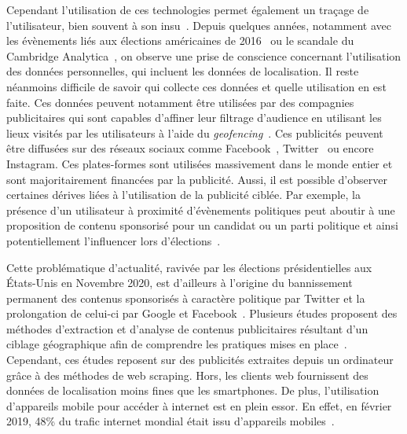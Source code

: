 \documentclass[runningheads]{llncs}
\begin{document}
Cependant l'utilisation de ces technologies permet également un traçage de l'utilisateur, bien souvent à son insu~\cite{almuhimedi_your_2015}. Depuis quelques années, notamment avec les évènements liés aux élections américaines de 2016~\cite{robert_mueller_report_2019} ou le scandale du Cambridge Analytica~\cite{isaak_user_2018}, on observe une prise de conscience concernant l'utilisation des données personnelles, qui incluent les données de localisation. Il reste néanmoins difficile de savoir qui collecte ces données et quelle utilisation en est faite. Ces données peuvent notamment être utilisées par des compagnies publicitaires qui sont capables d'affiner leur filtrage d'audience en utilisant les lieux visités par les utilisateurs à l'aide du \textit{geofencing}~\cite{google_geofencing_2020}. Ces publicités peuvent être diffusées sur des réseaux sociaux comme Facebook~\cite{facebook_for_buisness_a_2020}, Twitter~\cite{twitter_geo_2020} ou encore Instagram. Ces plates-formes sont utilisées massivement dans le monde entier et sont majoritairement financées par la publicité. Aussi, il est possible d'observer certaines dérives liées à l'utilisation de la publicité ciblée. Par exemple, la présence d'un utilisateur à proximité d'évènements politiques peut aboutir à une proposition de contenu sponsorisé pour un candidat ou un parti politique et ainsi potentiellement l'influencer lors d'élections~\cite{bradshaw_challenging_nodate}.

Cette problématique d'actualité, ravivée par les élections présidentielles aux États-Unis en Novembre 2020, est d'ailleurs à l'origine du bannissement permanent des contenus sponsorisés à caractère politique par Twitter et la prolongation de celui-ci par Google et Facebook~\cite{hannah_murphy_facebook_2020}. Plusieurs études proposent des méthodes d'extraction et d'analyse de contenus publicitaires résultant d'un ciblage géographique afin de comprendre les pratiques mises en place~\cite{nick_anstead_political_2018}. Cependant, ces études reposent sur des publicités extraites depuis un ordinateur grâce à des méthodes de web scraping. Hors, les clients web fournissent des données de localisation moins fines que les smartphones. De plus, l'utilisation d'appareils mobile pour accéder à internet est en plein essor. En effet, en février 2019, 48\% du trafic internet mondial était issu d'appareils mobiles~\cite{jclement_topic_2019}.
\end{document}
